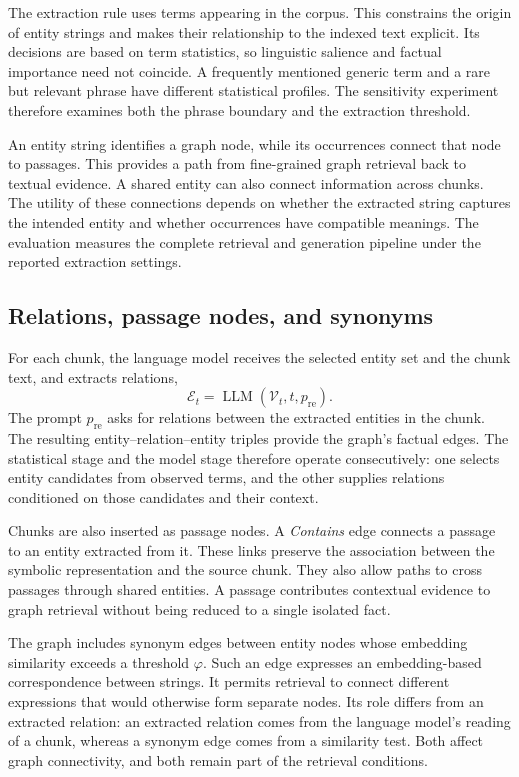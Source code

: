 The extraction rule uses terms appearing in the corpus. This constrains the origin of entity strings and makes their relationship to the indexed text explicit. Its decisions are based on term statistics, so linguistic salience and factual importance need not coincide. A frequently mentioned generic term and a rare but relevant phrase have different statistical profiles. The sensitivity experiment therefore examines both the phrase boundary and the extraction threshold.

An entity string identifies a graph node, while its occurrences connect that node to passages. This provides a path from fine-grained graph retrieval back to textual evidence. A shared entity can also connect information across chunks. The utility of these connections depends on whether the extracted string captures the intended entity and whether occurrences have compatible meanings. The evaluation measures the complete retrieval and generation pipeline under the reported extraction settings.

\subsection{Relations, passage nodes, and synonyms}
For each chunk, the language model receives the selected entity set and the chunk text, and extracts relations,
\begin{equation}
\mathcal{E}_t=\operatorname{LLM}(\mathcal{V}_t,t,p_{\mathrm{re}}).
\label{eq:agrag:relations}
\end{equation}
The prompt $p_{\mathrm{re}}$ asks for relations between the extracted entities in the chunk. The resulting entity--relation--entity triples provide the graph's factual edges. The statistical stage and the model stage therefore operate consecutively: one selects entity candidates from observed terms, and the other supplies relations conditioned on those candidates and their context.

Chunks are also inserted as passage nodes. A \textit{Contains} edge connects a passage to an entity extracted from it. These links preserve the association between the symbolic representation and the source chunk. They also allow paths to cross passages through shared entities. A passage contributes contextual evidence to graph retrieval without being reduced to a single isolated fact.

The graph includes synonym edges between entity nodes whose embedding similarity exceeds a threshold $\varphi$. Such an edge expresses an embedding-based correspondence between strings. It permits retrieval to connect different expressions that would otherwise form separate nodes. Its role differs from an extracted relation: an extracted relation comes from the language model's reading of a chunk, whereas a synonym edge comes from a similarity test. Both affect graph connectivity, and both remain part of the retrieval conditions.

